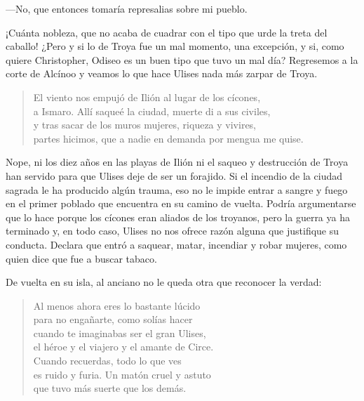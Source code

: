\documentclass[11pt,a4paper]{article}
\begin{document}
---No, que entonces tomaría represalias sobre mi pueblo.

¡Cuánta nobleza, que no acaba de cuadrar con el tipo que urde la treta del caballo! ¿Pero y si lo de Troya fue un mal momento, una excepción, y si, como quiere Christopher, Odiseo es un buen tipo que tuvo un mal día? Regresemos a la corte de Alcínoo y veamos lo que hace Ulises nada más zarpar de Troya.

\begin{verse}
El viento nos empujó de Ilión al lugar de los cícones,\\
a Ismaro. Allí saqueé la ciudad, muerte di a sus civiles,\\
y tras sacar de los muros mujeres, riqueza y vivires,\\
partes hicimos, que a nadie en demanda por mengua me quise.
\end{verse}

Nope, ni los diez años en las playas de Ilión ni el saqueo y destrucción de Troya han servido para que Ulises deje de ser un forajido. Si el incendio de la ciudad sagrada le ha producido algún trauma, eso no le impide entrar a sangre y fuego en el primer poblado que encuentra en su camino de vuelta. Podría argumentarse que lo hace porque los cícones eran aliados de los troyanos, pero la guerra ya ha terminado y, en todo caso, Ulises no nos ofrece razón alguna que justifique su conducta. Declara que entró a saquear, matar, incendiar y robar mujeres, como quien dice que fue a buscar tabaco.

De vuelta en su isla, al anciano no le queda otra que reconocer la verdad:


\begin{verse}
Al menos ahora eres lo bastante lúcido\\
para no engañarte, como solías hacer\\
cuando te imaginabas ser el gran Ulises,\\
el héroe y el viajero y el amante de Circe.\\
Cuando recuerdas, todo lo que ves\\
es ruido y furia. Un matón cruel y astuto\\
que tuvo más suerte que los demás.
\end{verse}
\end{document}
